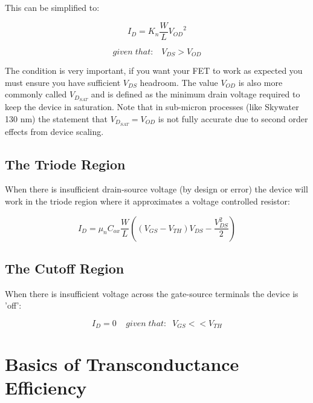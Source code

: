 \documentclass[11pt]{article}
\begin{document}
This can be simplified to:

\begin{equation}
I_D = K_n \frac{W}{L} {V_{OD}}^2
\end{equation}

\begin{equation}
given \; that: \;\;\; V_{DS} > V_{OD}
\end{equation}

The condition is very important, if you want your FET to work as expected you must ensure you have sufficient $V_{DS}$ headroom.  The value $V_{OD}$ is also more commonly called $V_{D_{SAT}}$ and is defined as the minimum drain voltage required to keep the device in saturation. Note that in sub-micron processes (like Skywater 130 nm) the statement that $V_{D_{SAT}} = V_{OD}$ is not fully accurate due to second order effects from device scaling.


\subsection{The Triode Region}

When there is insufficient drain-source voltage (by design or error) the device will work in the triode region where it approximates a voltage controlled resistor:

\begin{equation}
I_D = \mu_n C_{ox} \frac{W}{L} \left( (V_{GS} - V_{TH}) V_{DS} - \frac{V_{DS}^2}{2} \right)
\end{equation}

\subsection{The Cutoff Region}

When there is insufficient voltage across the gate-source terminals the device is 'off':

\begin{equation}
I_D = 0 \;\;\;\; given \; that: \;\; V_{GS} << V_{TH}
\end{equation}



\section{Basics of Transconductance Efficiency}
\end{document}
